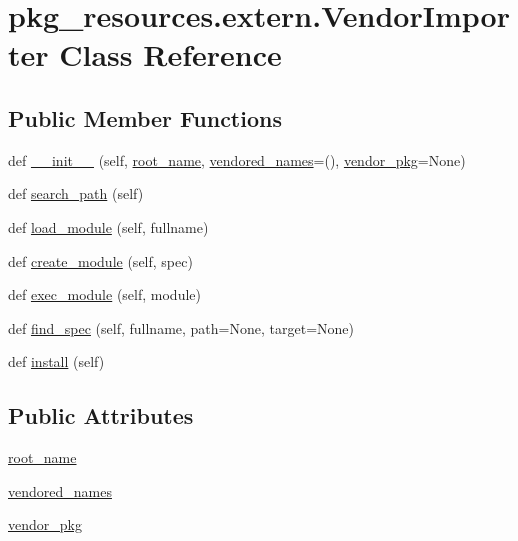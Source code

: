 \hypertarget{classpkg__resources_1_1extern_1_1VendorImporter}{}\section{pkg\+\_\+resources.\+extern.\+Vendor\+Importer Class Reference}
\label{classpkg__resources_1_1extern_1_1VendorImporter}
\subsection*{Public Member Functions}
\begin{DoxyCompactItemize}
\item 
def \hyperlink{classpkg__resources_1_1extern_1_1VendorImporter_a0655efdee333640e2c764753b63db9bf}{\+\_\+\+\_\+init\+\_\+\+\_\+} (self, \hyperlink{classpkg__resources_1_1extern_1_1VendorImporter_aa6dd174ffafaa82d89e9e7783558688e}{root\+\_\+name}, \hyperlink{classpkg__resources_1_1extern_1_1VendorImporter_abe2261f2f4d60f73258bec4857aefa27}{vendored\+\_\+names}=(), \hyperlink{classpkg__resources_1_1extern_1_1VendorImporter_a2aa3e3831167177b75341e463bfdbeb6}{vendor\+\_\+pkg}=None)
\item 
def \hyperlink{classpkg__resources_1_1extern_1_1VendorImporter_a52bda559ea3f43c176fc4c50b084c5a8}{search\+\_\+path} (self)
\item 
def \hyperlink{classpkg__resources_1_1extern_1_1VendorImporter_aa34920cbe53734c059a0565d5403aebc}{load\+\_\+module} (self, fullname)
\item 
def \hyperlink{classpkg__resources_1_1extern_1_1VendorImporter_af933073b749b12dc9f3cccfec2ef6b29}{create\+\_\+module} (self, spec)
\item 
def \hyperlink{classpkg__resources_1_1extern_1_1VendorImporter_ac60da3ad562877ba667c88e52f12e398}{exec\+\_\+module} (self, module)
\item 
def \hyperlink{classpkg__resources_1_1extern_1_1VendorImporter_a874f94b80cf0a7a51d853e0a05232e8d}{find\+\_\+spec} (self, fullname, path=None, target=None)
\item 
def \hyperlink{classpkg__resources_1_1extern_1_1VendorImporter_a94f50109a30bf7e9e5914c8f0f41b7dc}{install} (self)
\end{DoxyCompactItemize}
\subsection*{Public Attributes}
\begin{DoxyCompactItemize}
\item 
\hyperlink{classpkg__resources_1_1extern_1_1VendorImporter_aa6dd174ffafaa82d89e9e7783558688e}{root\+\_\+name}
\item 
\hyperlink{classpkg__resources_1_1extern_1_1VendorImporter_abe2261f2f4d60f73258bec4857aefa27}{vendored\+\_\+names}
\item 
\hyperlink{classpkg__resources_1_1extern_1_1VendorImporter_a2aa3e3831167177b75341e463bfdbeb6}{vendor\+\_\+pkg}
\end{DoxyCompactItemize}


